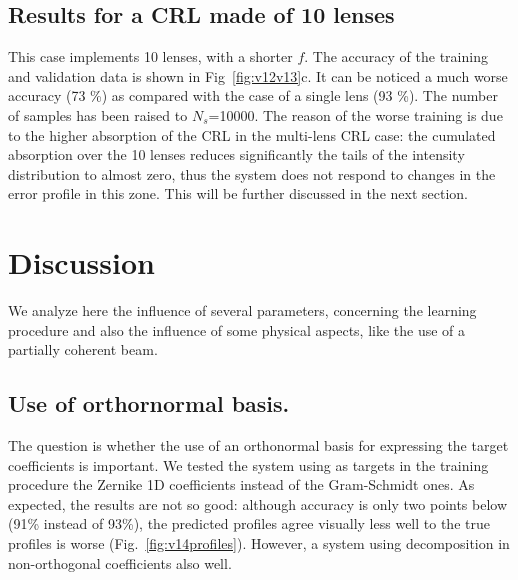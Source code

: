 \documentclass[preprint]{iucr}
\newcommand{\inred}[1]{{\color{red}#1}}
\begin{document}
\subsection{Results for a CRL made of 10 lenses}
 This case implements 10 lenses, with a shorter $f$. The accuracy of the training and validation data is shown in 
 Fig~\ref{fig:v12v13}c.
 It can be noticed a much worse accuracy (\inred{73 \%}) as compared with the case of a single lens (\inred{93 \%}). The number of samples has been raised to $N_s$=10000. The reason of the worse training is due to the higher absorption of the CRL in the multi-lens CRL case: the cumulated absorption over the 10 lenses reduces significantly the tails of the intensity distribution to almost zero, thus the system does not respond to changes in the error profile in this zone. This will be further discussed in the next section.

\section{Discussion}\label{sec:discussion}

We analyze here the influence of several parameters, concerning the learning procedure and also the influence of some physical aspects, like the use of a partially coherent beam.

\subsection{Use of orthornormal basis.} The question is whether the use of an orthonormal basis for expressing the target coefficients is important. We tested the system using as targets in the training procedure the Zernike 1D coefficients instead of the Gram-Schmidt ones. As expected, the results are not so good: although 
accuracy is only two points below (91\% instead of 93\%), the predicted profiles agree visually less well to the true profiles is worse (Fig.~\ref{fig:v14profiles}). However, a system using decomposition in non-orthogonal coefficients also well. 
\end{document}
